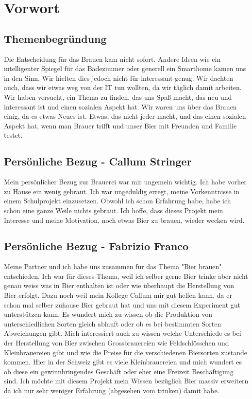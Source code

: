 \section{Vorwort}
\subsection{Themenbegründung}
Die Entscheidung für das Brauen kam nicht sofort. Andere Ideen
 wie ein intelligenter Spiegel für das Badezimmer oder generell 
 ein Smarthome kamen uns in den Sinn. Wir hielten dies jedoch nicht
  für interessant genug. Wir dachten auch, dass wir etwas weg von der
   IT tun wollten, da wir täglich damit arbeiten. Wir haben versucht, 
   ein Thema zu finden, das uns Spaß macht, das neu und interessant ist und einen sozialen Aspekt hat.
Wir waren uns über das Brauen einig,
 da es etwas Neues ist. Etwas, das nicht jeder macht, 
 und das einen sozialen Aspekt hat, wenn man Brauer trifft und unser Bier mit Freunden und Familie testet.
\subsection{Persönliche Bezug - Callum Stringer}
Mein persönlicher Bezug zur Brauerei war mir ungemein wichtig. Ich habe vorher zu Hause ein wenig gebraut. 
Ich war ungeduldig erregt, meine Vorkenntnisse in einem Schulprojekt einzusetzen. Obwohl ich schon Erfahrung habe, habe ich schon eine ganze Weile nichts gebraut.
 Ich hoffe, dass dieses Projekt mein Interesse und meine Motivation, noch etwas Bier zu brauen, wieder wecken wird.
 \subsection{Persönliche Bezug - Fabrizio Franco}
 Meine Partner und ich habe uns zusammen für das Thema "Bier brauen" entschieden. Ich war für dieses Thema, weil ich selber
  gerne Bier trinke aber nicht genau weiss was in Bier enthalten ist oder wie überhaupt die Herstellung von Bier erfolgt. 
  Dazu noch weil mein Kollege Callum mir gut helfen kann, da er schon mal selber zuhause Bier gebraut hat und uns mit diesem 
  Experiment gut unterstützen kann. Es wundert mich zu wissen ob die Produktion von unterschiedlichen Sorten gleich ablauft oder 
  ob es bei bestimmten Sorten Abweichungen gibt. Mich interessiert auch zu wissen welche Unterschiede es bei der Herstellung von Bier
   zwischen Grossbrauereien wie Feldschlösschen und Kleinbrauereien gibt und wie die Preise für die verschiedenen Biersorten zustande 
   kommen. Hier in der Schweiz gibt es viele Kleinbrauereien und mich wundert es ob diese ein gewinnbringendes Geschäft oder eher eine
    Freizeit Beschäftigung sind. 
 Ich möchte mit diesem Projekt mein Wissen bezüglich Bier massiv erweitern da ich nur sehr weniger Erfahrung (abgesehen vom trinken) damit habe.
